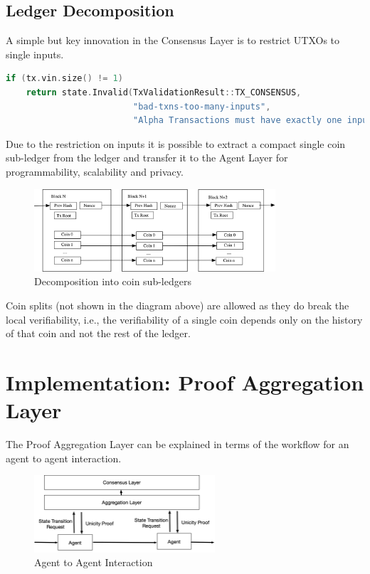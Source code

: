 \documentclass{article}
\begin{document}
\subsection*{Ledger Decomposition}


A simple but key innovation in the Consensus Layer is to restrict UTXOs to single inputs.

\begin{minipage}{\linewidth}
\begin{lstlisting}[language=C++]
if (tx.vin.size() != 1)
    return state.Invalid(TxValidationResult::TX_CONSENSUS,
                         "bad-txns-too-many-inputs",
                         "Alpha Transactions must have exactly one input");
\end{lstlisting}
\end{minipage}

Due to the restriction on inputs it is possible to extract a compact single coin sub-ledger from the ledger and transfer it to the Agent Layer for programmability, scalability and privacy.

\begin{figure}[H]
    \centering
    \includegraphics[width=0.8\textwidth]{CoinLedger.png}
    \caption{Decomposition into coin sub-ledgers}
    \label{fig:coinledger}
\end{figure}


Coin splits (not shown in the diagram above) are allowed as they do break the local verifiability, i.e., the verifiability of a single coin depends only on the history of that coin and not the rest of the ledger.


\section{Implementation: Proof Aggregation Layer}

The Proof Aggregation Layer can be explained in terms of the workflow for an agent to agent interaction.

\begin{figure}[H]
    \centering
    \includegraphics[width=0.6\textwidth]{Workflow.png}
    \caption{Agent to Agent Interaction}
    \label{fig:Workflow}
\end{figure}
\end{document}
